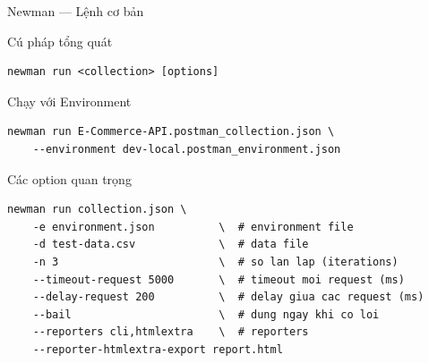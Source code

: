 \documentclass[aspectratio=169,10pt]{beamer}
\begin{document}
\begin{frame}[fragile]{Newman --- Lệnh cơ bản}
  \begin{block}{Cú pháp tổng quát}
\begin{lstlisting}[style=bash]
newman run <collection> [options]
\end{lstlisting}
  \end{block}

  \begin{block}{Chạy với Environment}
\begin{lstlisting}[style=bash]
newman run E-Commerce-API.postman_collection.json \
    --environment dev-local.postman_environment.json
\end{lstlisting}
  \end{block}

  \begin{block}{Các option quan trọng}
\begin{lstlisting}[style=bash]
newman run collection.json \
    -e environment.json          \  # environment file
    -d test-data.csv             \  # data file
    -n 3                         \  # so lan lap (iterations)
    --timeout-request 5000       \  # timeout moi request (ms)
    --delay-request 200          \  # delay giua cac request (ms)
    --bail                       \  # dung ngay khi co loi
    --reporters cli,htmlextra    \  # reporters
    --reporter-htmlextra-export report.html
\end{lstlisting}
  \end{block}
\end{frame}
\end{document}
